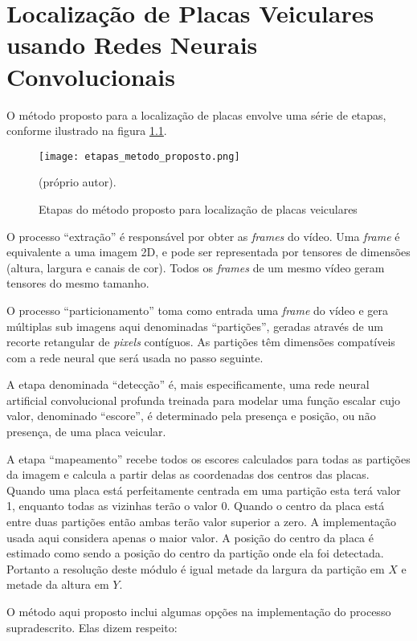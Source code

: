 \chapter{Localização de Placas Veiculares usando Redes Neurais Convolucionais}
	\label{ses:metodo}

O método proposto para a localização de placas envolve uma série de etapas,
conforme ilustrado na figura \ref{fig:etapas_metodo_proposto}.

\begin{figure}[!htb]
	\centering
	\texttt{[image: etapas\_metodo\_proposto.png]}
	\caption{Etapas do método proposto para localização de placas veiculares}
	\label{fig:etapas_metodo_proposto}
	(próprio autor).
\end{figure}

O processo ``extração'' é responsável por obter as \emph{frames} do vídeo.
Uma \emph{frame} é equivalente a uma imagem 2D, e pode ser representada por
tensores de dimensões  (altura, largura e canais de cor). Todos os \emph{frames} de um mesmo
vídeo geram tensores do mesmo tamanho.

O processo ``particionamento'' toma como entrada uma \emph{frame} do
vídeo e gera
múltiplas sub imagens aqui denominadas ``partições'', geradas através de um
recorte retangular de \emph{pixels} contíguos. As partições têm dimensões
compatíveis com a rede neural que será usada no passo seguinte.

A etapa denominada ``detecção'' é, mais especificamente, uma rede neural
artificial convolucional profunda treinada para modelar uma função escalar cujo
valor, denominado ``escore'', é determinado pela presença e posição, ou não
presença, de uma placa veicular.

A etapa ``mapeamento'' recebe todos os escores calculados para todas as
partições da imagem e calcula a partir delas as coordenadas dos centros das
placas. Quando uma placa está perfeitamente centrada em uma partição esta terá
valor 1, enquanto todas as vizinhas terão o valor 0. Quando o centro da placa
está entre duas partições então ambas terão valor superior a zero. A
implementação usada aqui considera apenas o maior valor. A posição do centro da
placa é estimado como sendo a posição do centro da partição onde ela foi
detectada. Portanto a resolução deste módulo é igual metade da largura da
partição em $X$ e metade da altura em $Y$.

O método aqui proposto inclui algumas opções na implementação do processo
supradescrito. Elas dizem respeito:

